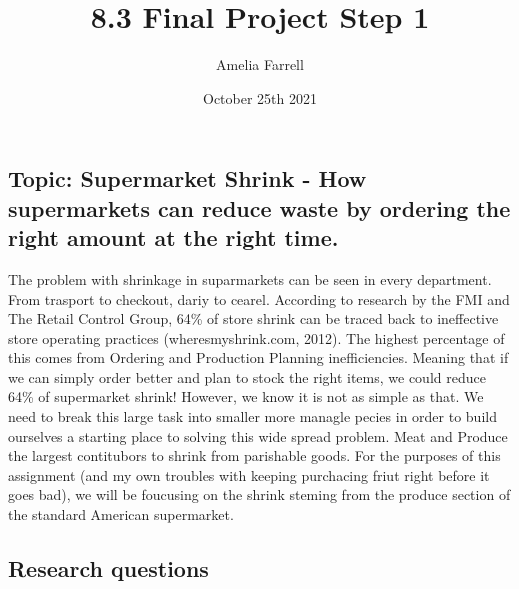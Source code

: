 \documentclass[]{article}
\title{8.3 Final Project Step 1}
\author{Amelia Farrell}
\date{October 25th 2021}
\begin{document}
\maketitle

\subsection{Topic: Supermarket Shrink - How supermarkets can reduce
waste by ordering the right amount at the right
time.}\label{topic-supermarket-shrink---how-supermarkets-can-reduce-waste-by-ordering-the-right-amount-at-the-right-time.}

The problem with shrinkage in suparmarkets can be seen in every
department. From trasport to checkout, dariy to cearel. According to
research by the FMI and The Retail Control Group, 64\% of store shrink
can be traced back to ineffective store operating practices
(wheresmyshrink.com, 2012). The highest percentage of this comes from
Ordering and Production Planning inefficiencies. Meaning that if we can
simply order better and plan to stock the right items, we could reduce
64\% of supermarket shrink! However, we know it is not as simple as
that. We need to break this large task into smaller more managle pecies
in order to build ourselves a starting place to solving this wide spread
problem. Meat and Produce the largest contitubors to shrink from
parishable goods. For the purposes of this assignment (and my own
troubles with keeping purchacing friut right before it goes bad), we
will be foucusing on the shrink steming from the produce section of the
standard American supermarket.

\subsection{Research questions}\label{research-questions}
\end{document}
